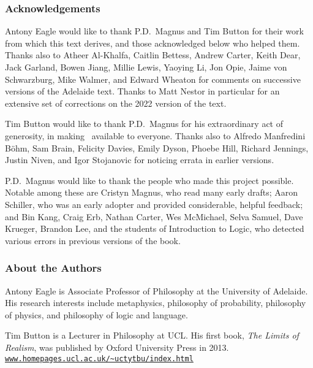 \thispagestyle{empty}
\onecolumn



\subsubsection*{Acknowledgements}
Antony Eagle would like to thank P.D.\ Magnus and Tim Button for their work from which this text derives, and those acknowledged below who helped them. Thanks also to Atheer Al-Khalfa, Caitlin Bettess, Andrew Carter, Keith Dear, Jack Garland, Bowen Jiang, Millie Lewis, Yaoying Li, Jon Opie, Jaime von Schwarzburg, Mike Walmer, and Edward Wheaton for comments on successive versions of the Adelaide text. Thanks to Matt Nestor in particular for an extensive set of corrections on the 2022 version of the text.\medskip

Tim Button would like to thank P.D.\ Magnus for his extraordinary act of generosity, in making \forallx\ available to everyone. Thanks also to Alfredo Manfredini Böhm, Sam Brain, Felicity Davies, Emily Dyson, Phoebe Hill, Richard Jennings, Justin Niven,  and Igor Stojanovic for noticing errata in earlier versions. \medskip

P.D.\ Magnus would like to thank the people who made this project possible. Notable among these are Cristyn Magnus, who read many early drafts; Aaron Schiller, who was an early adopter and provided considerable, helpful feedback; {and} Bin Kang, Craig Erb, Nathan Carter, Wes McMichael, Selva Samuel,  Dave Krueger, Brandon Lee, and the students of Introduction to Logic, who detected various errors in previous versions of the book. 

\subsubsection*{About the Authors}

Antony Eagle is Associate Professor of Philosophy at the University of Adelaide. His research interests include metaphysics, philosophy of probability, philosophy of physics, and philosophy of logic and language. 
\medskip


Tim Button is a Lecturer in Philosophy at UCL. His first book, \emph{The Limits of Realism}, was published by Oxford University Press in 2013. \href{http://www.homepages.ucl.ac.uk/~uctytbu/index.html}{\nolinkurl{www.homepages.ucl.ac.uk/~uctytbu/index.html}}
\medskip

